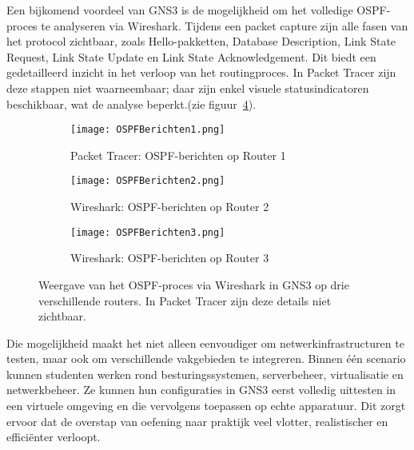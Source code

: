 Een bijkomend voordeel van GNS3 is de mogelijkheid om het volledige OSPF-proces te analyseren via Wireshark. Tijdens een packet capture zijn alle fasen van het protocol zichtbaar, zoals Hello-pakketten, Database Description, Link State Request, Link State Update en Link State Acknowledgement. Dit biedt een gedetailleerd inzicht in het verloop van het routingproces. In Packet Tracer zijn deze stappen niet waarneembaar; daar zijn enkel visuele statusindicatoren beschikbaar, wat de analyse beperkt.(zie figuur~\ref{fig:ospf_wireshark}).

\begin{figure}[H]
    \centering
    
    \begin{subfigure}[b]{\textwidth}
        \centering
        \texttt{[image: OSPFBerichten1.png]}
        \caption{Packet Tracer: OSPF-berichten op Router 1}
        \label{fig:ospf_r1}
    \end{subfigure}
    
    \vspace{1em}
    
    \begin{subfigure}[b]{\textwidth}
        \centering
        \texttt{[image: OSPFBerichten2.png]}
        \caption{Wireshark: OSPF-berichten op Router 2}
        \label{fig:ospf_r2}
    \end{subfigure}
    
    \vspace{1em}
    
    \begin{subfigure}[b]{\textwidth}
        \centering
        \texttt{[image: OSPFBerichten3.png]}
        \caption{Wireshark: OSPF-berichten op Router 3}
        \label{fig:ospf_r3}
    \end{subfigure}
    
    \caption[OSPF-verkeer zichtbaar via Wireshark in GNS3.]{\label{fig:ospf_wireshark}Weergave van het OSPF-proces via Wireshark in GNS3 op drie verschillende routers. In Packet Tracer zijn deze details niet zichtbaar.}
\end{figure}



\vspace{0.3cm}

Die mogelijkheid maakt het niet alleen eenvoudiger om netwerkinfrastructuren te testen, maar ook om verschillende vakgebieden te integreren. Binnen één scenario kunnen studenten werken rond besturingssystemen, serverbeheer, virtualisatie en netwerkbeheer. Ze kunnen hun configuraties in GNS3 eerst volledig uittesten in een virtuele omgeving en die vervolgens toepassen op echte apparatuur. Dit zorgt ervoor dat de overstap van oefening naar praktijk veel vlotter, realistischer en efficiënter verloopt.

